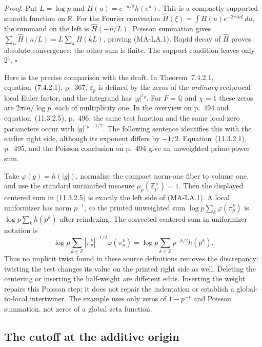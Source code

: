 \emph{Proof.}
Put $L=\log p$ and $H(u)=e^{-u/2}h(e^u)$.  This is a compactly
supported smooth function on $\mathbb R$.  For the Fourier convention
$\widehat H(\xi)=\int H(u)e^{-2\pi i u\xi}\,du$, the summand on
the left is $\widehat H(-n/L)$.  Poisson summation gives
$\sum_n\widehat H(n/L)=L\sum_k H(kL)$, proving (MA-LA.1).
Rapid decay of $\widehat H$ proves absolute convergence; the other
sum is finite.  The support condition leaves only $2^1$.
\hfill$\square$

Here is the precise comparison with the draft.  In Theorem~7.4.2.1,
equation~(7.4.2.1), p.~367, $\varepsilon_p$ is defined by the zeros of
the \emph{ordinary} reciprocal local Euler factor, and the integrand
has $|g|^{\varepsilon_p}$.  For $F=\mathbb Q$ and $\chi=1$ these
zeros are $2\pi i n/\log p$, each of multiplicity one.  In the overview
on p.~494 and equation~(11.3.2.5), p.~496, the same test function and
the same local-zero parameters occur with
$|g|^{\varepsilon_p-1/2}$.  The following sentence identifies this
with the earlier right side, although its exponent differs by
$-1/2$.  Equation~(11.3.2.1), p.~495, and the Poisson conclusion on
p.~494 give an unweighted prime-power sum.

Take $\varphi(g)=h(|g|)$, normalize the compact norm-one fiber to
volume one, and use the standard unramified measure
$\mu_p(\mathbb Z_p^\times)=1$.  Then the displayed centered sum in
(11.3.2.5) is exactly the left side of (MA-LA.1).  A local uniformizer
has norm $p^{-1}$, so the printed unweighted sum
$\log p\sum_k\varphi(\pi_p^k)$ is
$\log p\sum_k h(p^k)$ after reindexing.  The corrected centered sum
in uniformizer notation is
\[
 \log p\sum_{k\in\mathbb Z}
 |\pi_p^k|^{-1/2}\varphi(\pi_p^k)
 =\log p\sum_{k\in\mathbb Z}p^{-k/2}h(p^k).
 \tag{MA-LA.2}
\]
Thus no implicit twist found in these source definitions removes the
discrepancy: twisting the test changes its value on the printed right
side as well.  Deleting the centering or inserting the half-weight are
different edits.  Inserting the weight repairs this Poisson step; it
does not repair the indentation or establish a global-to-local
intertwiner.  The example uses only zeros of $1-p^{-s}$ and Poisson
summation, not zeros of a global zeta function.

\subsection{The cutoff at the additive origin}

